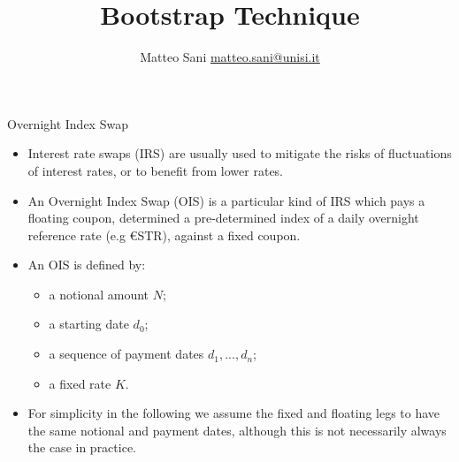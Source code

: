 \documentclass{beamer}
\title{Bootstrap Technique}
\author{Matteo Sani \href{mailto:matteo.sani@unisi.it}{matteo.sani@unisi.it}}
\begin{document}
\begin{frame}[plain]
  \maketitle
\end{frame}

\begin{frame}{Overnight Index Swap}
\begin{itemize}
\item Interest rate swaps (IRS) are usually used to mitigate the risks of fluctuations of interest rates, or to benefit from lower rates. 
\item An Overnight Index Swap (OIS) is a particular kind of IRS which pays a floating coupon, determined a pre-determined index of a daily overnight reference rate (e.g €STR), against a fixed coupon.  
\item An OIS is defined by:
\begin{itemize}
  \item a notional amount $N$;
  \item a starting date $d_0$;
  \item a sequence of payment dates $d_1,...,d_n$;
  \item a fixed rate $K$.
\end{itemize}
\item For simplicity in the following we assume the fixed and floating legs to have the same notional and payment dates, although this is not necessarily always the case in practice.
\end{itemize}
\end{frame}
\end{document}

